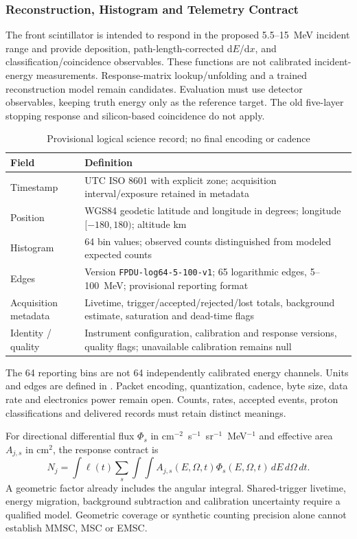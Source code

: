 \subsubsection{Reconstruction, Histogram and Telemetry Contract}\label{app:payload-coincidence}\label{app:payload-readout}
The front scintillator is intended to respond in the proposed 5.5--15~MeV incident range and provide deposition, path-length-corrected d$E$/d$x$, and classification/coincidence observables. These functions are not calibrated incident-energy measurements. Response-matrix lookup/unfolding and a trained reconstruction model remain candidates. Evaluation must use detector observables, keeping truth energy only as the reference target. The old five-layer stopping response and silicon-based coincidence do not apply.

\begin{table}[H]\centering\small
\caption{Provisional logical science record; no final encoding or cadence}\label{tab:fpdu-telemetry}
\begin{tabularx}{\linewidth}{@{}p{3.6cm}X@{}}\toprule
Field & Definition\\\midrule
Timestamp & UTC ISO 8601 with explicit zone; acquisition interval/exposure retained in metadata\\
Position & WGS84 geodetic latitude and longitude in degrees; longitude $[-180,180)$; altitude km\\
Histogram & 64 bin values; observed counts distinguished from modeled expected counts\\
Edges & Version \texttt{FPDU-log64-5-100-v1}; 65 logarithmic edges, 5--100~MeV; provisional reporting format\\
Acquisition metadata & Livetime, trigger/accepted/rejected/lost totals, background estimate, saturation and dead-time flags\\
Identity / quality & Instrument configuration, calibration and response versions, quality flags; unavailable calibration remains null\\\bottomrule
\end{tabularx}\end{table}
The 64 reporting bins are not 64 independently calibrated energy channels. Units and edges are defined in . Packet encoding, quantization, cadence, byte size, data rate and electronics power remain open. Counts, rates, accepted events, proton classifications and delivered records must retain distinct meanings.

For directional differential flux $\Phi_s$ in cm$^{-2}$~s$^{-1}$~sr$^{-1}$~MeV$^{-1}$ and effective area $A_{j,s}$ in cm$^2$, the response contract is
\begin{equation}
N_j=\int\ell(t)\sum_s\int\!\int A_{j,s}(E,\Omega,t)\Phi_s(E,\Omega,t)\,dE\,d\Omega\,dt.
\end{equation}
A geometric factor already includes the angular integral. Shared-trigger livetime, energy migration, background subtraction and calibration uncertainty require a qualified model. Geometric coverage or synthetic counting precision alone cannot establish MMSC, MSC or EMSC.


